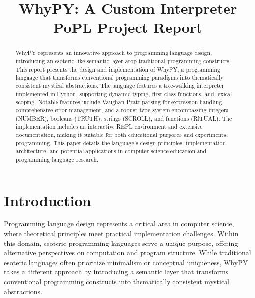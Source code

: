 \documentclass[conference]{IEEEtran}
\begin{document}


\title{WhyPY: A Custom Interpreter \\ \Large{PoPL Project Report}}

\author{
  \and
}

\maketitle

\begin{abstract}
WhyPY represents an innovative approach to programming language design, introducing an esoteric like semantic layer atop traditional programming constructs. This report presents the design and implementation of WhyPY, a programming language that transforms conventional programming paradigms into thematically consistent mystical abstractions. The language features a tree-walking interpreter implemented in Python, supporting dynamic typing, first-class functions, and lexical scoping. Notable features include Vaughan Pratt parsing for expression handling, comprehensive error management, and a robust type system encompassing integers (NUMBER), booleans (TRUTH), strings (SCROLL), and functions (RITUAL). The implementation includes an interactive REPL environment and extensive documentation, making it suitable for both educational purposes and experimental programming. This paper details the language's design principles, implementation architecture, and potential applications in computer science education and programming language research.
\end{abstract}





\section{Introduction}
Programming language design represents a critical area in computer science, where theoretical principles meet practical implementation challenges. Within this domain, esoteric programming languages serve a unique purpose, offering alternative perspectives on computation and program structure. While traditional esoteric languages often prioritize minimalism or conceptual uniqueness, WhyPY takes a different approach by introducing a semantic layer that transforms conventional programming constructs into thematically consistent mystical abstractions.
\end{document}
